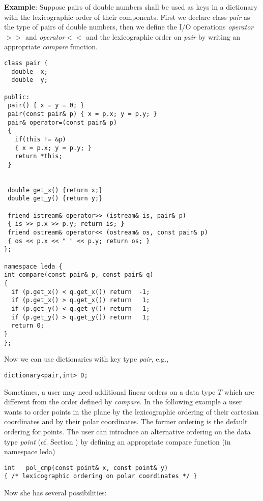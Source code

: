 {\bf Example}: Suppose pairs of double numbers shall be used as keys 
in a dictionary with the lexicographic order of their components.
First we declare class {\it pair} as the type of pairs of double numbers, 
then we define the I/O operations {\it operator}$>>${} and 
{\it operator}$<<${} and the lexicographic order on {\it pair} by 
writing an appropriate {\it compare} function.

\begin{verbatim}
class pair {
  double  x;
  double  y;

public:
 pair() { x = y = 0; }
 pair(const pair& p) { x = p.x; y = p.y; }
 pair& operator=(const pair& p)
 {
   if(this != &p) 
   { x = p.x; y = p.y; }
   return *this;
 }
     

 double get_x() {return x;}
 double get_y() {return y;}

 friend istream& operator>> (istream& is, pair& p) 
 { is >> p.x >> p.y; return is; }
 friend ostream& operator<< (ostream& os, const pair& p) 
 { os << p.x << " " << p.y; return os; }
};

namespace leda {
int compare(const pair& p, const pair& q)
{
  if (p.get_x() < q.get_x()) return  -1;
  if (p.get_x() > q.get_x()) return   1; 
  if (p.get_y() < q.get_y()) return  -1;
  if (p.get_y() > q.get_y()) return   1;
  return 0;
}
};
\end{verbatim}

\smallskip
Now we can use dictionaries with key type {\it pair}, e.g.,

\begin{verbatim}
dictionary<pair,int> D;
\end{verbatim}

Sometimes, a user may need additional linear orders on a data type $T$ which
are different from the order defined by {\it compare}. In the following example
a user wants to order points in the plane by the lexicographic ordering of
their cartesian coordinates and by their polar coordinates. The former ordering
is the default ordering for points. The user can introduce an alternative
ordering on the data type {\it point} (cf. Section
) by defining
an appropriate compare function (in namespace leda)
\begin{verbatim}
int   pol_cmp(const point& x, const point& y)
{ /* lexicographic ordering on polar coordinates */ }
\end{verbatim}
Now she has several possibilities: 

